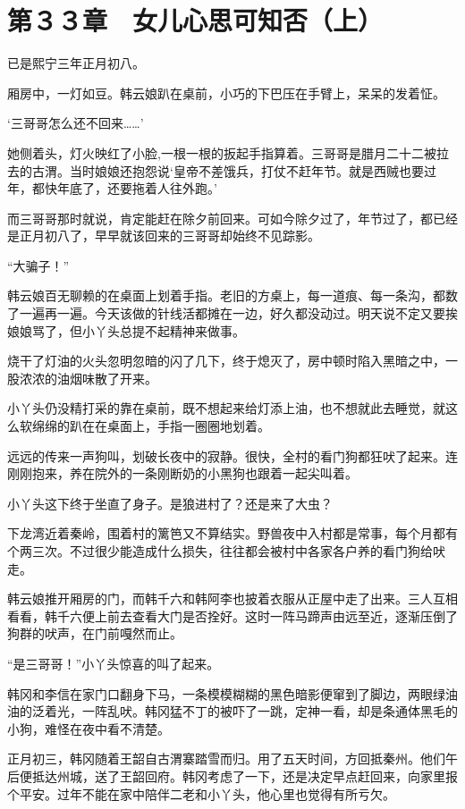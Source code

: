 \section{第３３章　女儿心思可知否（上）}

已是熙宁三年正月初八。

厢房中，一灯如豆。韩云娘趴在桌前，小巧的下巴压在手臂上，呆呆的发着怔。

‘三哥哥怎么还不回来……’

她侧着头，灯火映红了小脸,一根一根的扳起手指算着。三哥哥是腊月二十二被拉去的古渭。当时娘娘还抱怨说‘皇帝不差饿兵，打仗不赶年节。就是西贼也要过年，都快年底了，还要拖着人往外跑。’

而三哥哥那时就说，肯定能赶在除夕前回来。可如今除夕过了，年节过了，都已经是正月初八了，早早就该回来的三哥哥却始终不见踪影。

“大骗子！”

韩云娘百无聊赖的在桌面上划着手指。老旧的方桌上，每一道痕、每一条沟，都数了一遍再一遍。今天该做的针线活都摊在一边，好久都没动过。明天说不定又要挨娘娘骂了，但小丫头总提不起精神来做事。

烧干了灯油的火头忽明忽暗的闪了几下，终于熄灭了，房中顿时陷入黑暗之中，一股浓浓的油烟味散了开来。

小丫头仍没精打采的靠在桌前，既不想起来给灯添上油，也不想就此去睡觉，就这么软绵绵的趴在在桌面上，手指一圈圈地划着。

远远的传来一声狗叫，划破长夜中的寂静。很快，全村的看门狗都狂吠了起来。连刚刚抱来，养在院外的一条刚断奶的小黑狗也跟着一起尖叫着。

小丫头这下终于坐直了身子。是狼进村了？还是来了大虫？

下龙湾近着秦岭，围着村的篱笆又不算结实。野兽夜中入村都是常事，每个月都有个两三次。不过很少能造成什么损失，往往都会被村中各家各户养的看门狗给吠走。

韩云娘推开厢房的门，而韩千六和韩阿李也披着衣服从正屋中走了出来。三人互相看看，韩千六便上前去查看大门是否拴好。这时一阵马蹄声由远至近，逐渐压倒了狗群的吠声，在门前嘎然而止。

“是三哥哥！”小丫头惊喜的叫了起来。

韩冈和李信在家门口翻身下马，一条模模糊糊的黑色暗影便窜到了脚边，两眼绿油油的泛着光，一阵乱吠。韩冈猛不丁的被吓了一跳，定神一看，却是条通体黑毛的小狗，难怪在夜中看不清楚。

正月初三，韩冈随着王韶自古渭寨踏雪而归。用了五天时间，方回抵秦州。他们午后便抵达州城，送了王韶回府。韩冈考虑了一下，还是决定早点赶回来，向家里报个平安。过年不能在家中陪伴二老和小丫头，他心里也觉得有所亏欠。

